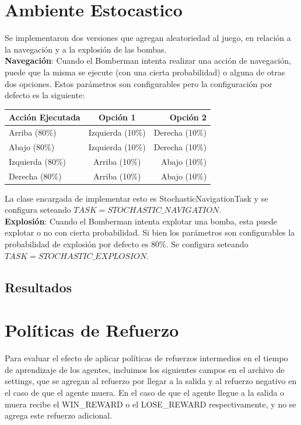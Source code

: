 \documentclass[a4paper,spanish] {article}
\begin{document}
\section{Ambiente Estocastico}

	Se implementaron dos versiones que agregan aleatoriedad al juego, en relaci\'on a la navegaci\'on y a la explosi\'on de las bombas.\\
	
	\textbf{Navegaci\'on}: Cuando el Bomberman intenta realizar una acci\'on de navegaci\'on, puede que la misma se ejecute (con una cierta probabilidad) o alguna de otras dos opciones. Estos par\'ametros son configurables pero la configuraci\'on por defecto es la siguiente:
	
\begin{center}
\begin{tabular}{ l | c | r }
  Acci\'on Ejecutada & Opci\'on 1 & Opci\'on 2 \\
  \hline
  Arriba (80\%) & Izquierda (10\%) & Derecha (10\%) \\
  Abajo (80\%) & Izquierda (10\%) & Derecha (10\%) \\
  Izquierda (80\%) & Arriba (10\%) & Abajo (10\%) \\
  Derecha (80\%) & Arriba (10\%) & Abajo (10\%) \\  
\end{tabular}
\end{center}

	La clase encargada de implementar esto es StochasticNavigationTask y se configura seteando $TASK = STOCHASTIC\_NAVIGATION$.\\
	
		\textbf{Explosi\'on}: Cuando el Bomberman intenta explotar una bomba, esta puede explotar o no con cierta probabilidad. Si bien los par\'ametros son configurables la probabilidad de explosi\'on por defecto es 80\%. Se configura seteando $TASK = STOCHASTIC\_EXPLOSION$.

	\subsection{Resultados}
	
 \section{Pol\'iticas de Refuerzo}
 	Para evaluar el efecto de aplicar pol\'iticas de refuerzos intermedios en el tiempo de aprendizaje de los agentes, incluimos los siguientes campos en el archivo de settings, que se agregan al refuerzo por llegar a la salida y al refuerzo negativo en el caso de que el agente muera. En el caso de que el agente llegue a la salida o muera recibe el WIN\_REWARD o el LOSE\_REWARD respectivamente, y no se agrega este refuerzo adicional.
\end{document}
